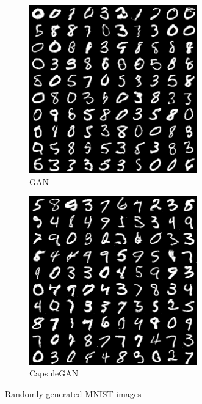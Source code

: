 \begin{figure}
\centering
\begin{subfigure}{.49\textwidth}
\centering
\includegraphics[width=0.8\textwidth]{img/gan_mnist_randomly_generated.png}
\caption{GAN}
\label{fig:gan_mnist_randomly_generated}
\end{subfigure}
\begin{subfigure}{.49\textwidth}
\centering
\includegraphics[width=0.8\textwidth]{img/capsgan_mnist_randomly_generated.png}
\caption{CapsuleGAN}
\label{fig:capsgan_mnist_randomly_generated}
\end{subfigure}
\label{fig:mnist_randomly_generated}
\caption{Randomly generated MNIST images}
\end{figure}


